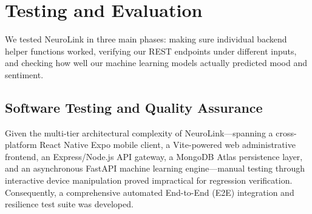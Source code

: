 \section{Testing and Evaluation}
We tested NeuroLink in three main phases: making sure individual backend helper functions worked, verifying our REST endpoints under different inputs, and checking how well our machine learning models actually predicted mood and sentiment.

\subsection{Software Testing and Quality Assurance}
Given the multi-tier architectural complexity of NeuroLink---spanning a cross-platform React Native Expo mobile client, a Vite-powered web administrative frontend, an Express/Node.js API gateway, a MongoDB Atlas persistence layer, and an asynchronous FastAPI machine learning engine---manual testing through interactive device manipulation proved impractical for regression verification. Consequently, a comprehensive automated End-to-End (E2E) integration and resilience test suite was developed.


